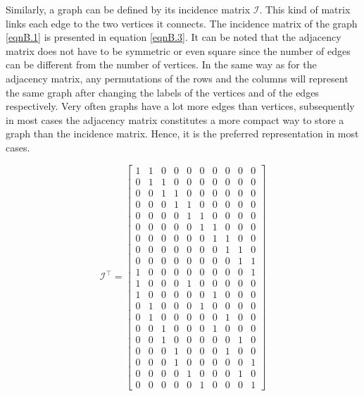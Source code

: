 Similarly, a graph can be defined by its incidence matrix $\mathcal{I}$. This kind of matrix links each edge to the two vertices it connects. The incidence matrix of the graph \ref{eqnB.1} is presented in equation \eqref{eqnB.3}. It can be noted that the adjacency matrix does not have to be symmetric or even square since the number of edges can be different from the number of vertices. In the same way as for the adjacency matrix, any permutations of the rows and the columns will represent the same graph after changing the labels of the vertices and of the edges respectively. Very often graphs have a lot more edges than vertices, subsequently in most cases the adjacency matrix constitutes a more compact way to store a graph than the incidence matrix. Hence, it is the preferred representation in most cases.

\begin{equation} \label{eqnB.3}
\mathcal{I}^{\top}=
\begin{bmatrix}
1 & 1 & 0 & 0 & 0 & 0 & 0 & 0 & 0 & 0 \\
0 & 1 & 1 & 0 & 0 & 0 & 0 & 0 & 0 & 0 \\
0 & 0 & 1 & 1 & 0 & 0 & 0 & 0 & 0 & 0 \\
0 & 0 & 0 & 1 & 1 & 0 & 0 & 0 & 0 & 0 \\
0 & 0 & 0 & 0 & 1 & 1 & 0 & 0 & 0 & 0 \\
0 & 0 & 0 & 0 & 0 & 1 & 1 & 0 & 0 & 0 \\
0 & 0 & 0 & 0 & 0 & 0 & 1 & 1 & 0 & 0 \\
0 & 0 & 0 & 0 & 0 & 0 & 0 & 1 & 1 & 0 \\
0 & 0 & 0 & 0 & 0 & 0 & 0 & 0 & 1 & 1 \\
1 & 0 & 0 & 0 & 0 & 0 & 0 & 0 & 0 & 1 \\
1 & 0 & 0 & 0 & 1 & 0 & 0 & 0 & 0 & 0 \\
1 & 0 & 0 & 0 & 0 & 0 & 1 & 0 & 0 & 0 \\
0 & 1 & 0 & 0 & 0 & 1 & 0 & 0 & 0 & 0 \\
0 & 1 & 0 & 0 & 0 & 0 & 0 & 1 & 0 & 0 \\
0 & 0 & 1 & 0 & 0 & 0 & 1 & 0 & 0 & 0 \\
0 & 0 & 1 & 0 & 0 & 0 & 0 & 0 & 1 & 0 \\
0 & 0 & 0 & 1 & 0 & 0 & 0 & 1 & 0 & 0 \\
0 & 0 & 0 & 1 & 0 & 0 & 0 & 0 & 0 & 1 \\
0 & 0 & 0 & 0 & 1 & 0 & 0 & 0 & 1 & 0 \\
0 & 0 & 0 & 0 & 0 & 1 & 0 & 0 & 0 & 1
\end{bmatrix}
\end{equation}

